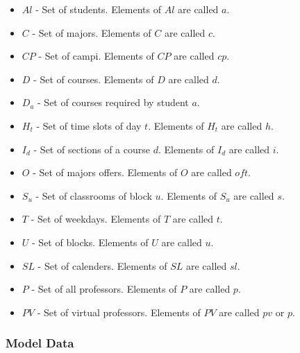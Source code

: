 \begin{itemize}
\item $Al$ - Set of students. Elements of $Al$ are called $a$.
\item $C$ - Set of majors. Elements of $C$ are called $c$.
\item $CP$ - Set of campi. Elements of $CP$ are called $cp$.
\item $D$ - Set of courses. Elements of $D$ are called $d$.
\item $D_{a}$ - Set of courses required by student $a$.
\item $H_{t}$ - Set of time slots of day $t$. Elements of $H_{t}$ are called $h$.
\item $I_{d}$ - Set of sections of a course $d$. Elements of $I_{d}$ are called $i$.
\item $O$ - Set of majors offers. Elements of $O$ are called $oft$.
\item $S_{u}$ - Set of classrooms of block $u$. Elements of $S_{u}$ are called $s$.
\item $T$ - Set of weekdays. Elements of $T$ are called $t$.
\item $U$ - Set of blocks. Elements of $U$ are called $u$.
\item $SL$ - Set of calenders. Elements of $SL$ are called $sl$.
\item $P$ - Set of all professors. Elements of $P$ are called $p$.
\item $PV$ - Set of virtual professors. Elements of $PV$ are called $pv$ or $p$.
\end{itemize}

\subsubsection{Model Data}

